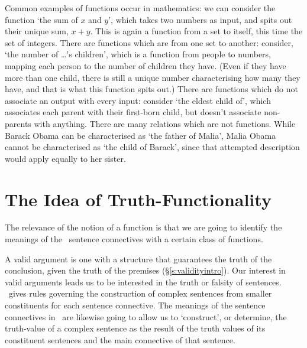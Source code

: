 Common examples of functions occur in mathematics: we can consider the function `the sum of $x$ and $y$', which takes two numbers as input, and spits out their unique sum, $x+y$. This is again a function from a set to itself, this time the set of integers. There are functions which are from one set to another: consider, `the number of …'s children', which is a function from people to numbers, mapping each person to the number of children they have. (Even if they have more than one child, there is still a unique number characterising how many they have, and that is what this function spits out.) There are functions which do not associate an output with every input: consider `the eldest child of', which associates each parent with their first-born child, but doesn't associate non-parents with anything. There are many relations which are not functions. While Barack Obama can be characterised as `the father of Malia', Malia Obama cannot be characterised as `the child of Barack', since that attempted description would apply equally to her sister.  

\section{The Idea of Truth-Functionality}

The relevance of the notion of a function is that we are going to identify the meanings of the \TFL\ sentence connectives with a certain class of functions.

A valid argument is one with a structure that guarantees the truth of the conclusion, given the truth of the premises (§\ref{s:validityintro}). Our interest in valid arguments leads us to be interested in the truth or falsity of sentences. \TFL\ gives rules governing the construction of complex sentences from smaller constituents for each sentence connective. The meanings of the sentence connectives in \TFL\ are likewise going to allow us to `construct', or determine, the truth-value of a complex sentence as the result of the truth values of its constituent sentences and the main connective of that sentence. 


